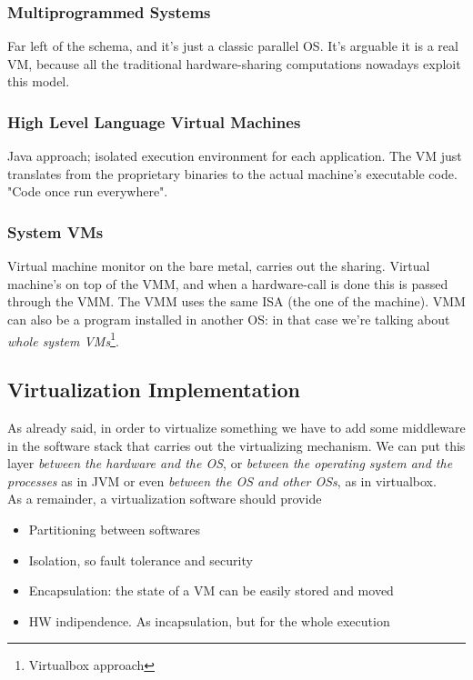 \documentclass{article}
\begin{document}
				\subsubsection{Multiprogrammed Systems}
					Far left of the schema, and it's just a classic parallel OS. It's arguable it is a real VM, because all the traditional hardware-sharing computations nowadays exploit this model. 
					
				\subsubsection{High Level Language Virtual Machines}
					Java approach; isolated execution environment for each application. The VM just translates from the proprietary binaries to the actual machine's executable code. "Code once run everywhere".
					
				\subsubsection{System VMs}
					Virtual machine monitor on the bare metal, carries out the sharing. Virtual machine's on top of the VMM, and when a hardware-call is done this is passed through the VMM. The VMM uses the same ISA (the one of the machine). VMM can also be a program installed in another OS: in that case we're talking about \emph{whole system VMs}\footnote{Virtualbox approach}.
				
			\subsection{Virtualization Implementation}
				As already said, in order to virtualize something we have to add some middleware in the software stack that carries out the virtualizing mechanism. We can put this layer \emph{between the hardware and the OS}, or \emph{between the operating system and the processes} as in JVM or even \emph{between the OS and other OSs}, as in virtualbox.\\
				As a remainder, a virtualization software should provide
				\begin{itemize}
					\item Partitioning between softwares
					\item Isolation, so fault tolerance and security
					\item Encapsulation: the state of a VM can be easily stored and moved
					\item HW indipendence. As incapsulation, but for the whole execution
				\end{itemize}
			
\end{document}
